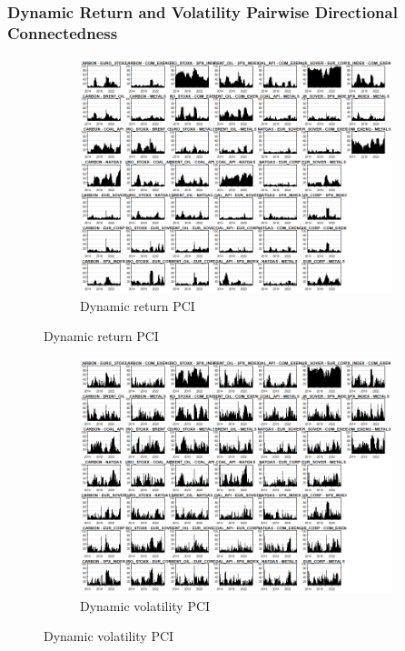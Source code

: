 \documentclass[preprint, 3p,
authoryear]{elsarticle} %
\begin{document}
\begin{landscape}
\newpage

\subsubsection{Dynamic Return and Volatility Pairwise Directional Connectedness}

\begin{figure}[!ht]
  \caption{Dynamic Return and Volatility Pairwise Connectedness Index (Jan 2013 – Jan 2025)}
  \centering
  \begin{subfigure}[a]{\textwidth}
    \caption{Dynamic return PCI}
    \includegraphics[width = 1.1\linewidth]{31aApdxD-12-220-RetPCI}
  \end{subfigure}
\end{figure}
\begin{figure}[!ht]
  \ContinuedFloat
  \centering
    \begin{subfigure}[b]{\textwidth}\ContinuedFloat
      \caption{Dynamic volatility PCI}
      \includegraphics[width = 1.2\linewidth]{31bApdxD-12-220-VolPCI}
    \end{subfigure}
\end{figure}










\end{landscape}

\newpage

\renewcommand\refname{References}

\end{document}
